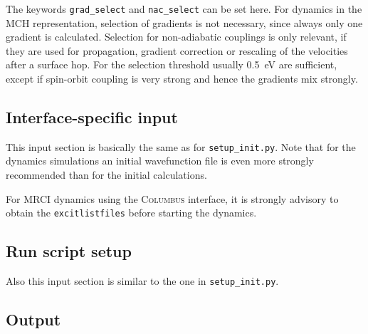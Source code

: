 \documentclass[a4paper,11pt,DIV=15,openany,twoside=false]{scrbook}
\newcommand{\ttt}[1]{\texttt{#1}}
\begin{document}
The keywords \ttt{grad\_select} and \ttt{nac\_select} can be set here. For dynamics in the MCH representation, selection of gradients is not necessary, since always only one gradient is calculated. Selection for non-adiabatic couplings is only relevant, if they are used for propagation, gradient correction or rescaling of the velocities after a surface hop. For the selection threshold usually 0.5~eV are sufficient, except if spin-orbit coupling is very strong and hence the gradients mix strongly.

\subsection{Interface-specific input}

This input section is basically the same as for \ttt{setup\_init.py}. Note that for the dynamics simulations an initial wavefunction file is even more strongly recommended than for the initial calculations.

For MRCI dynamics using the \textsc{Columbus} interface, it is strongly advisory to obtain the \ttt{excitlistfiles} before starting the dynamics. 

\subsection{Run script setup}

Also this input section is similar to the one in \ttt{setup\_init.py}.

\subsection{Output}
\end{document}
